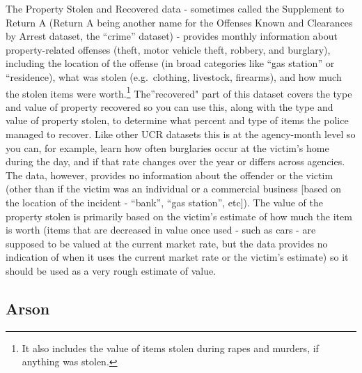 \documentclass[
  12pt,
  openany]{book}
\begin{document}
The Property Stolen and Recovered data - sometimes called the Supplement to Return A (Return A being another name for the Offenses Known and Clearances by Arrest dataset, the ``crime'' dataset) - provides monthly information about property-related offenses (theft, motor vehicle theft, robbery, and burglary), including the location of the offense (in broad categories like ``gas station'' or ``residence), what was stolen (e.g.~clothing, livestock, firearms), and how much the stolen items were worth.\footnote{It also includes the value of items stolen during rapes and murders, if anything was stolen.} The''recovered" part of this dataset covers the type and value of property recovered so you can use this, along with the type and value of property stolen, to determine what percent and type of items the police managed to recover. Like other UCR datasets this is at the agency-month level so you can, for example, learn how often burglaries occur at the victim's home during the day, and if that rate changes over the year or differs across agencies. The data, however, provides no information about the offender or the victim (other than if the victim was an individual or a commercial business {[}based on the location of the incident - ``bank'', ``gas station'', etc{]}). The value of the property stolen is primarily based on the victim's estimate of how much the item is worth (items that are decreased in value once used - such as cars - are supposed to be valued at the current market rate, but the data provides no indication of when it uses the current market rate or the victim's estimate) so it should be used as a very rough estimate of value.

\hypertarget{arson}{%
\subsection{Arson}\label{arson}}
\end{document}
